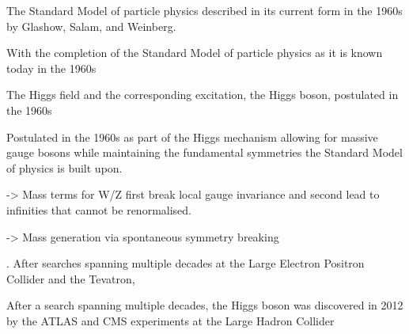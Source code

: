 %
%
%
%
%








The Standard Model of particle physics described in its current form in the
1960s by Glashow, Salam, and Weinberg.


With the completion of the Standard Model of particle physics as it is known
today in the 1960s

The Higgs field and the corresponding excitation, the Higgs boson, postulated in
the 1960s

\cite{Englert:1964et,Higgs:1964pj}


Postulated in the 1960s as part of the Higgs mechanism allowing for massive
gauge bosons while maintaining the fundamental symmetries the Standard Model of
physics is built upon.


-> Mass terms for W/Z first break local gauge invariance and second lead to
infinities that cannot be renormalised.

-> Mass generation via spontaneous symmetry breaking


. After searches spanning multiple decades at the Large Electron
Positron Collider and the Tevatron,

After a search spanning multiple decades, the Higgs boson was discovered in 2012
by the ATLAS and CMS experiments at the Large Hadron Collider


